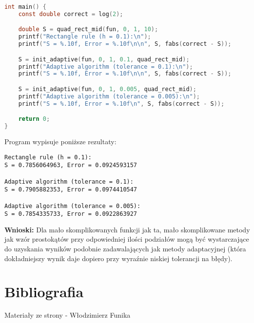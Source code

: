\documentclass{article}
\begin{document}
\newpage

\begin{lstlisting}[language=C, firstnumber=48]
int main() {
    const double correct = log(2);

    double S = quad_rect_mid(fun, 0, 1, 10);
    printf("Rectangle rule (h = 0.1):\n");
    printf("S = %.10f, Error = %.10f\n\n", S, fabs(correct - S));

    S = init_adaptive(fun, 0, 1, 0.1, quad_rect_mid);
    printf("Adaptive algorithm (tolerance = 0.1):\n");
    printf("S = %.10f, Error = %.10f\n\n", S, fabs(correct - S));

    S = init_adaptive(fun, 0, 1, 0.005, quad_rect_mid);
    printf("Adaptive algorithm (tolerance = 0.005):\n");
    printf("S = %.10f, Error = %.10f\n", S, fabs(correct - S));

    return 0;
}
\end{lstlisting}

\noindent
Program wypisuje poniższe rezultaty:

\begin{verbatim}
Rectangle rule (h = 0.1):
S = 0.7856064963, Error = 0.0924593157

Adaptive algorithm (tolerance = 0.1):
S = 0.7905882353, Error = 0.0974410547

Adaptive algorithm (tolerance = 0.005):
S = 0.7854335733, Error = 0.0922863927
\end{verbatim}

\noindent
\textbf{Wnioski:} Dla mało skomplikowanych funkcji jak ta, mało skomplikowane metody jak wzór prostokątów przy odpowiedniej ilości podziałów mogą być wystarczające do uzyskania wyników podobnie zadawalających jak metody adaptacyjnej (która dokładniejszy wynik daje dopiero przy wyraźnie niskiej tolerancji na błędy). 

\subsection{}

\section{Bibliografia}
Materiały ze strony - Włodzimierz Funika
\end{document}
